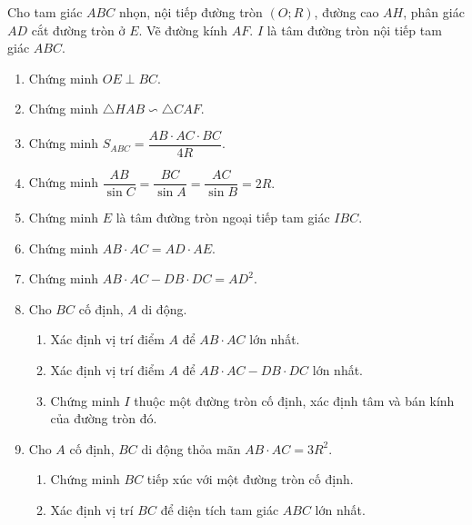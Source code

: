 \begin{bt}%
	Cho tam giác $ABC$ nhọn, nội tiếp đường tròn $(O; R)$, đường cao $AH$, phân giác $AD$ cắt đường tròn ở $E$. Vẽ đường kính $AF$. $I$ là tâm đường tròn nội tiếp tam giác $ABC$.
	\begin{enumerate}
		\item Chứng minh $OE \perp BC$.
		\item Chứng minh $\triangle HAB \backsim \triangle CAF.$
		\item Chứng minh $S_{ABC}= \dfrac{AB \cdot AC \cdot BC}{4R}.$
		\item Chứng minh $\dfrac{AB}{\sin C}= \dfrac{BC}{\sin A}= \dfrac{AC}{\sin B}= 2R.$
		\item Chứng minh $E$ là tâm đường tròn ngoại tiếp tam giác $IBC$.
		\item Chứng minh $AB \cdot AC= AD \cdot AE$.
		\item Chứng minh $AB \cdot AC- DB \cdot DC= AD^2.$
		\item Cho $BC$ cố định, $A$ di động.
		\begin{enumerate}[1)]
			\item Xác định vị trí điểm $A$ để $AB \cdot AC$ lớn nhất.
			\item Xác định vị trí điểm $A$ để $AB \cdot AC- DB \cdot DC$ lớn nhất.
			\item Chứng minh $I$ thuộc một đường tròn cố định, xác định tâm và bán kính của đường tròn đó.
		\end{enumerate}
		\item Cho $A$ cố định, $BC$ di động thỏa mãn $AB \cdot AC= 3R^2.$
		\begin{enumerate}[1)]
			\item Chứng minh $BC$ tiếp xúc với một đường tròn cố định.
			\item Xác định vị trí $BC$ để diện tích tam giác $ABC$ lớn nhất.
		\end{enumerate}
	\end{enumerate}
\end{bt}
